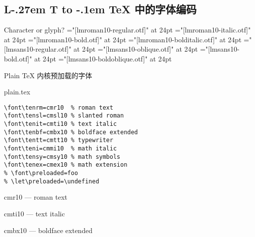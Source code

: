 \documentclass{beamer}
\makeatletter
\DeclareRobustCommand\LaTeX{L\kern-.27em%
  {\sbox\z@ T%
   \vbox to\ht\z@{\hbox{\check@mathfonts
                        \fontsize\sf@size\z@
                        \math@fontsfalse\selectfont
                        A}%
                  \vss}%
  }%
  \kern-.1em%
  \TeX}
\makeatother
\begin{document}
\begin{frame}
\section{\LaTeX{} 中的字体编码}
\end{frame}

\begin{frame}{Character or glyph?}
\centering
\font\0="[lmroman10-regular.otf]"    at 24pt
\font\1="[lmroman10-italic.otf]"     at 24pt
\font\2="[lmroman10-bold.otf]"       at 24pt
\font\3="[lmroman10-bolditalic.otf]" at 24pt
\font\4="[lmsans10-regular.otf]"     at 24pt
\font\5="[lmsans10-oblique.otf]"     at 24pt
\font\6="[lmsans10-bold.otf]"        at 24pt
\font\7="[lmsans10-boldoblique.otf]" at 24pt
\end{frame}

\begin{frame}[fragile]{Plain \TeX{} 内核预加载的字体}
\begin{exampleblock}{plain.tex}
\begin{verbatim}
\font\tenrm=cmr10  % roman text
\font\tensl=cmsl10 % slanted roman
\font\tenit=cmti10 % text italic
\font\tenbf=cmbx10 % boldface extended
\font\tentt=cmtt10 % typewriter
\font\teni=cmmi10  % math italic
\font\tensy=cmsy10 % math symbols
\font\tenex=cmex10 % math extension
% \font\preloaded=foo
% \let\preloaded=\undefined
\end{verbatim}
\end{exampleblock}
\end{frame}

\begin{frame}{cmr10 --- roman text}
\end{frame}

\begin{frame}{cmti10 --- text italic}
\end{frame}

\begin{frame}{cmbx10 --- boldface extended}
\end{frame}
\end{document}

